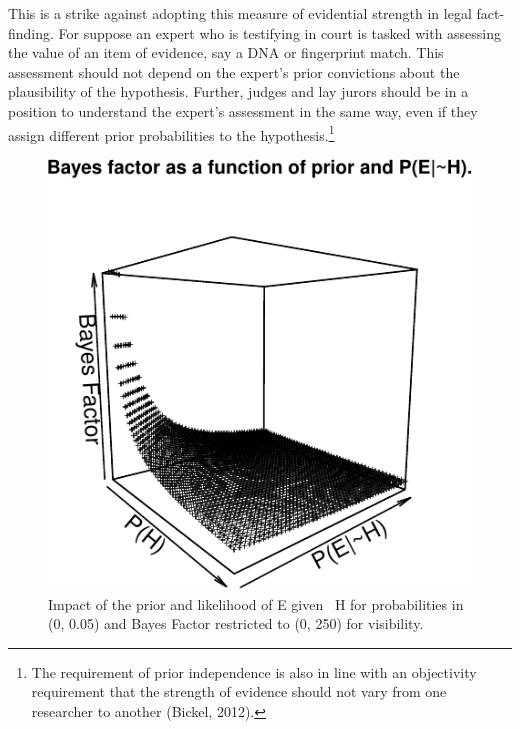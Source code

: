 \documentclass[
  10pt,
  dvipsnames,enabledeprecatedfontcommands]{scrartcl}
\begin{document}
This is a strike against adopting this measure of evidential strength in
legal fact-finding. For suppose an expert who is testifying in court is
tasked with assessing the value of an item of evidence, say a DNA or
fingerprint match. This assessment should not depend on the expert's
prior convictions about the plausibility of the hypothesis. Further,
judges and lay jurors should be in a position to understand the expert's
assessment in the same way, even if they assign different prior
probabilities to the hypothesis.\footnote{The requirement of prior
  independence is also in line with an objectivity requirement that the
  strength of evidence should not vary from one researcher to another
  (Bickel, 2012).}

\footnotesize

\normalsize

\begin{figure}


\begin{center}\includegraphics[width=1\linewidth]{lr-chapter4_files/figure-latex/fig-BayesFactorPrior-1} \end{center}
\caption{Impact of the prior and likelihood of E given ~H for probabilities in (0, 0.05) and Bayes Factor restricted to (0, 250) for visibility.}
\label{fig:BayesFactorPrior}
\end{figure}
\end{document}
